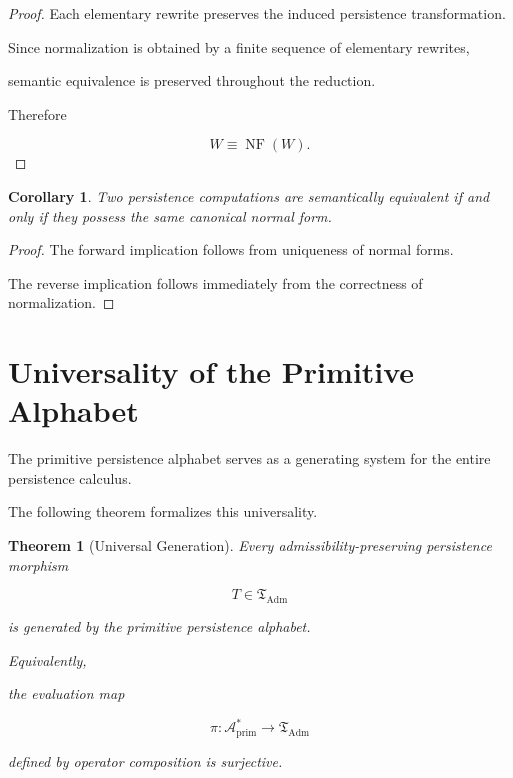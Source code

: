 \documentclass[11pt]{book}
\numberwithin{equation}{chapter}
\theoremstyle{definition}
\theoremstyle{plain}
\newtheorem{theorem}[definition]{Theorem}
\newtheorem{corollary}[definition]{Corollary}
\begin{document}
\begin{proof}

Each elementary rewrite preserves the induced persistence
transformation.

Since normalization is obtained by a finite sequence of elementary
rewrites,

semantic equivalence is preserved throughout the reduction.

Therefore

\[
W
\equiv
\operatorname{NF}(W).
\]

\end{proof}

\begin{corollary}

Two persistence computations are semantically equivalent if and only if
they possess the same canonical normal form.

\end{corollary}

\begin{proof}

The forward implication follows from uniqueness of normal forms.

The reverse implication follows immediately from the correctness of
normalization.

\end{proof}

\section{Universality of the Primitive Alphabet}

The primitive persistence alphabet serves as a generating system for the
entire persistence calculus.

The following theorem formalizes this universality.

\begin{theorem}[Universal Generation]

Every admissibility-preserving persistence morphism

\[
T
\in
\mathfrak T_{\operatorname{Adm}}
\]

is generated by the primitive persistence alphabet.

Equivalently,

the evaluation map

\[
\pi
:
\mathcal A_{\mathrm{prim}}^*
\rightarrow
\mathfrak T_{\operatorname{Adm}}
\]

defined by operator composition is surjective.

\end{theorem}
\end{document}
